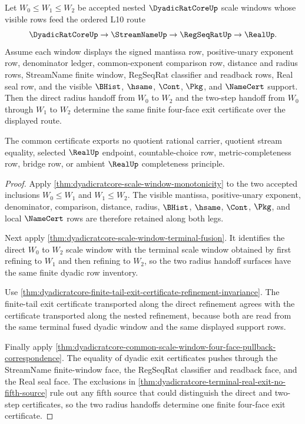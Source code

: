 \begin{theorem}
\label{thm:dyadicratcore-common-scale-window-radius-monotone-composition}
Let $W_0 \leq W_1 \leq W_2$ be accepted nested $\DyadicRatCoreUp$ scale windows whose visible rows feed the ordered L10 route
$$
\DyadicRatCoreUp \to \StreamNameUp \to \RegSeqRatUp \to \RealUp .
$$
Assume each window displays the signed mantissa row, positive-unary exponent row, denominator ledger, common-exponent comparison row, distance and radius rows, StreamName finite window, RegSeqRat classifier and readback rows, Real seal row, and the visible $\BHist$, $\hsame$, $\Cont$, $\Pkg$, and $\NameCert$ support. Then the direct radius handoff from $W_0$ to $W_2$ and the two-step handoff from $W_0$ through $W_1$ to $W_2$ determine the same finite four-face exit certificate over the displayed route.

The common certificate exports no quotient rational carrier, quotient stream equality, selected $\RealUp$ endpoint, countable-choice row, metric-completeness row, bridge row, or ambient $\RealUp$ completeness principle.
\end{theorem}
\begin{proof}
Apply \autoref{thm:dyadicratcore-scale-window-monotonicity} to the two accepted inclusions $W_0 \leq W_1$ and $W_1 \leq W_2$. The visible mantissa, positive-unary exponent, denominator, comparison, distance, radius, $\BHist$, $\hsame$, $\Cont$, $\Pkg$, and local $\NameCert$ rows are therefore retained along both legs.

Next apply \autoref{thm:dyadicratcore-scale-window-terminal-fusion}. It identifies the direct $W_0$ to $W_2$ scale window with the terminal scale window obtained by first refining to $W_1$ and then refining to $W_2$, so the two radius handoff surfaces have the same finite dyadic row inventory.

Use \autoref{thm:dyadicratcore-finite-tail-exit-certificate-refinement-invariance}. The finite-tail exit certificate transported along the direct refinement agrees with the certificate transported along the nested refinement, because both are read from the same terminal fused dyadic window and the same displayed support rows.

Finally apply \autoref{thm:dyadicratcore-common-scale-window-four-face-pullback-correspondence}. The equality of dyadic exit certificates pushes through the StreamName finite-window face, the RegSeqRat classifier and readback face, and the Real seal face. The exclusions in \autoref{thm:dyadicratcore-terminal-real-exit-no-fifth-source} rule out any fifth source that could distinguish the direct and two-step certificates, so the two radius handoffs determine one finite four-face exit certificate.
\end{proof}

